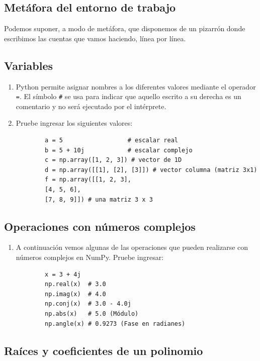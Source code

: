 \subsection{Metáfora del entorno de trabajo}

Podemos suponer, a modo de metáfora, que disponemos de un pizarrón donde escribimos las cuentas que vamos haciendo, línea por línea.

\subsection{Variables}

\begin{enumerate}
	
	\item Python permite asignar nombres a los diferentes valores mediante el operador \texttt{=}. El símbolo \texttt{\#} se usa para indicar que aquello escrito a su derecha es un comentario y no será ejecutado por el intérprete.
	
	\item Pruebe ingresar los siguientes valores:
	\begin{verbatim}
		a = 5                  # escalar real
		b = 5 + 10j            # escalar complejo
		c = np.array([1, 2, 3]) # vector de 1D
		d = np.array([[1], [2], [3]]) # vector columna (matriz 3x1)
		f = np.array([[1, 2, 3], 
		[4, 5, 6], 
		[7, 8, 9]]) # una matriz 3 x 3
	\end{verbatim}
\end{enumerate}

\subsection{Operaciones con números complejos}

\begin{enumerate}
	\item A continuación vemos algunas de las operaciones que pueden realizarse con números complejos en NumPy. Pruebe ingresar:
	\begin{verbatim}
		x = 3 + 4j
		np.real(x)  # 3.0
		np.imag(x)  # 4.0
		np.conj(x)  # 3.0 - 4.0j
		np.abs(x)   # 5.0 (Módulo)
		np.angle(x) # 0.9273 (Fase en radianes)
	\end{verbatim}
\end{enumerate}

\subsection{Raíces y coeficientes de un polinomio}

